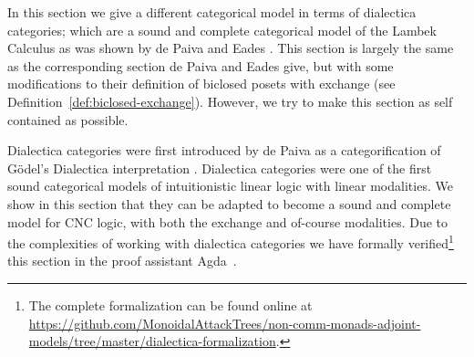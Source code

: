\newcommand{\Set}{\mathsf{Set}}
\newcommand{\Dial}[2]{\mathsf{Dial}_{#1}(#2)}

In this section we give a different categorical model in terms of
dialectica categories; which are a sound and complete categorical
model of the Lambek Calculus as was shown by de Paiva and Eades
\cite{dePaiva2018}. This section is largely the same as the
corresponding section de Paiva and Eades give, but with some
modifications to their definition of biclosed posets with exchange
(see Definition~\ref{def:biclosed-exchange}).  However, we try to make
this section as self contained as possible.

Dialectica categories were first introduced by de Paiva as a
categorification of G\"odel's Dialectica interpretation
\cite{depaiva1990}.  Dialectica categories were one of the first sound
categorical models of intuitionistic linear logic with linear
modalities.  We show in this section that they can be adapted to
become a sound and complete model for CNC logic, with both the
exchange and of-course modalities.  Due to the complexities of working
with dialectica categories we have formally verified\footnote{The
  complete formalization can be found online at
  \url{https://github.com/MonoidalAttackTrees/non-comm-monads-adjoint-models/tree/master/dialectica-formalization}.}
this section in the proof assistant Agda~\cite{bove2009}.

